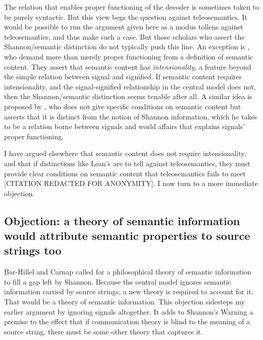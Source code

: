 The relation that enables proper functioning of the decoder is sometimes taken to be purely syntactic.
But this view begs the question against teleosemantics.
It would be possible to run the argument given here as a modus tollens against teleosemantics, and thus make such a case.
But those scholars who assert the Shannon/semantic distinction do not typically push this line.
An exception is \citet[$\S$4]{hutto2013radicalizing}, who demand more than merely proper functioning from a definition of semantic content.
They assert that semantic content has \textit{intensionality}, a feature beyond the simple relation between signal and signified.
If semantic content requires intensionality, and the signal-signified relationship in the central model does not, then the Shannon/semantic distinction seems tenable after all.
A similar idea is proposed by \citet{lean2014shannon}, who does not give specific conditions on semantic content but asserts that it is distinct from the notion of Shannon information, which he takes to be a relation borne between signals and world affairs that explains signals' proper functioning.

I have argued elsewhere that semantic content does not require intensionality, and that if distinctions like Lean's are to tell against teleosemantics, they must provide clear conditions on semantic content that teleosemantics fails to meet [CITATION REDACTED FOR ANONYMITY].
I now turn to a more immediate objection.




\subsection{Objection: a theory of semantic information would attribute semantic properties to source strings too}

Bar-Hillel and Carnap called for a philosophical theory of semantic information to fill a gap left by Shannon.
Because the central model ignores semantic information carried by source strings, a new theory is required to account for it.
That would be a theory of semantic information.
This objection sidesteps my earlier argument by ignoring signals altogether.
It adds to {\sc Shannon's Warning} a premise to the effect that if communication theory is blind to the meaning of a source string, there must be some other theory that captures it.

